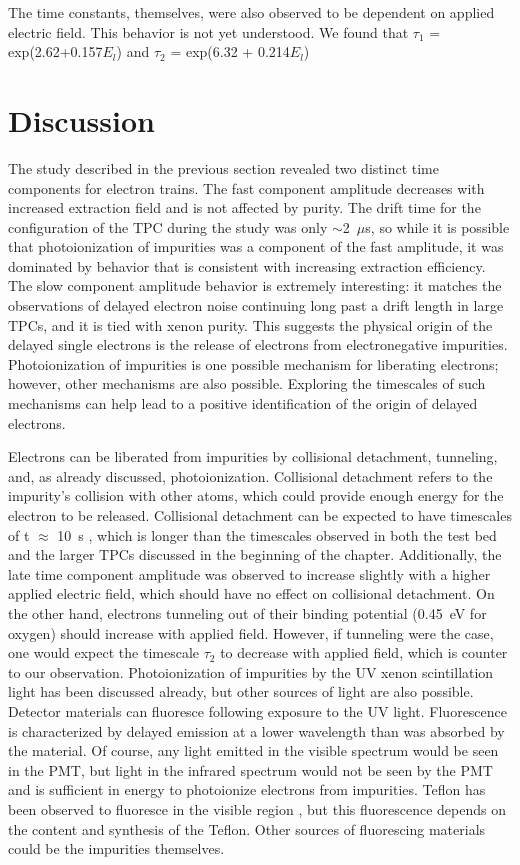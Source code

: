 The time constants, themselves, were also observed to be dependent on applied electric field. This behavior is not yet understood. We found that $\tau_{1}$ = exp(2.62+0.157$E_{l}$) and $\tau_{2}$ = exp(6.32 + 0.214$E_{l}$)

\section{Discussion}
The study described in the previous section revealed two distinct time components for electron trains. The fast component amplitude decreases with increased extraction field and is not affected by purity. The drift time for the configuration of the \ac{TPC} during the study was only $\sim$2~$\mu$s, so while it is possible that photoionization of impurities was a component of the fast amplitude, it was dominated by behavior that is consistent with increasing extraction efficiency. The slow component amplitude behavior is extremely interesting: it matches the observations of delayed electron noise continuing long past a drift length in large \ac{TPC}s, and it is tied with xenon purity. This suggests the physical origin of the delayed single electrons is the release of electrons from electronegative impurities. Photoionization of impurities is one possible mechanism for liberating electrons; however, other mechanisms are also possible. Exploring the timescales of such mechanisms can help lead to a positive identification of the origin of delayed electrons. 

Electrons can be liberated from impurities by collisional detachment, tunneling, and, as already discussed, photoionization. Collisional detachment refers to the impurity's collision with other atoms, which could provide enough energy for the electron to be released. Collisional detachment can be expected to have timescales of t $\approx$ 10~s \cite{SorensenKamdin2018}, which is longer than the timescales observed in both the test bed and the larger \ac{TPC}s discussed in the beginning of the chapter. Additionally, the late time component amplitude was observed to increase slightly with a higher applied electric field, which should have no effect on collisional detachment. On the other hand, electrons tunneling out of their binding potential (0.45~eV for oxygen) should increase with applied field. However, if tunneling were the case, one would expect the timescale $\tau_{2}$ to decrease with applied field, which is counter to our observation. Photoionization of impurities by the UV xenon scintillation light has been discussed already, but other sources of light are also possible. Detector materials can fluoresce following exposure to the UV light. Fluorescence is characterized by delayed emission at a lower wavelength than was absorbed by the material. Of course, any light emitted in the visible spectrum would be seen in the \ac{PMT}, but light in the infrared spectrum would not be seen by the \ac{PMT} and is sufficient in energy to photoionize electrons from impurities. Teflon has been observed to fluoresce in the visible region \cite{Gachkovskii1969} \cite{Khatipov2011}, but this fluorescence depends on the content and synthesis of the Teflon. Other sources of fluorescing materials could be the impurities themselves. 

